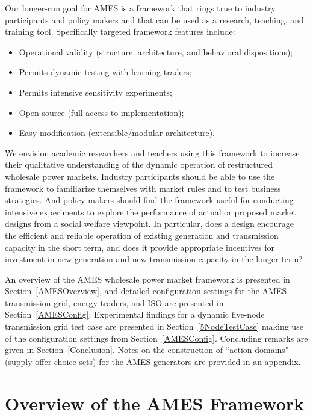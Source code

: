 \documentclass[12pt]{article}
\begin{document}
Our longer-run goal for AMES is a framework that rings true to industry participants and policy makers and that can be used as a research, teaching, and training tool.  Specifically targeted framework features include:
\begin{itemize}
\item Operational validity (structure, architecture, and behavioral dispositions);
\item Permits dynamic testing with learning traders;
\item Permits intensive sensitivity experiments;
\item Open source (full access to implementation);
\item Easy modification (extensible/modular architecture).
\end{itemize}
We envision academic researchers and teachers using this framework to increase their qualitative understanding of the 
dynamic operation of restructured wholesale power markets.  Industry participants should be able to use the framework to familiarize themselves with market rules and to test business strategies.  And policy makers should 
find the framework useful for conducting intensive experiments to explore the performance of actual or proposed market designs from a social welfare viewpoint. In particular, does a design encourage the efficient and reliable operation of existing generation and transmission capacity in the short term, and does it provide appropriate incentives for investment in new generation and new transmission capacity in the longer term?

An overview of the AMES wholesale power market framework is presented in Section~\ref{AMESOverview}, and detailed 
configuration settings for the AMES transmission grid, energy traders, and ISO are presented in 
Section~\ref{AMESConfig}.  Experimental findings for a dynamic five-node transmission grid test case are presented in Section~\ref{5NodeTestCase} making use of the configuration settings from Section~\ref{AMESConfig}. Concluding remarks are given in Section~\ref{Conclusion}.  Notes on the construction of ``action domains" (supply offer choice sets) for the AMES generators are provided in an appendix.


\section{Overview of the AMES Framework \label{AMESOverview} }
\end{document}
